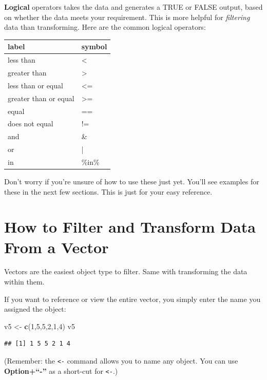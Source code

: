 \documentclass[
]{book}
\newenvironment{Shaded}{\begin{snugshade}}{\end{snugshade}}
\newcommand{\DecValTok}[1]{\textcolor[rgb]{0.00,0.00,0.81}{#1}}
\newcommand{\KeywordTok}[1]{\textcolor[rgb]{0.13,0.29,0.53}{\textbf{#1}}}
\newcommand{\NormalTok}[1]{#1}
\newcommand{\StringTok}[1]{\textcolor[rgb]{0.31,0.60,0.02}{#1}}
\begin{document}
\textbf{Logical} operators takes the data and generates a TRUE or FALSE output, based on whether the data meets your requirement. This is more helpful for \emph{filtering} data than transforming. Here are the common logical operators:

\begin{tabular}{ll}
\toprule
label & symbol\\
\midrule
less than & <\\
greater than & >\\
less than or equal & <=\\
greater than or equal & >=\\
equal & ==\\
\addlinespace
does not equal & !=\\
and & \&\\
or & |\\
in & \%in\%\\
\bottomrule
\end{tabular}

Don't worry if you're unsure of how to use these just yet. You'll see examples for these in the next few sections. This is just for your easy reference.

\hypertarget{how-to-filter-and-transform-data-from-a-vector}{%
\section{How to Filter and Transform Data From a Vector}\label{how-to-filter-and-transform-data-from-a-vector}}

Vectors are the easiest object type to filter. Same with transforming the data within them.

If you want to reference or view the entire vector, you simply enter the name you assigned the object:

\begin{Shaded}
\begin{Highlighting}[]
\NormalTok{v5 <-}\StringTok{ }\KeywordTok{c}\NormalTok{(}\DecValTok{1}\NormalTok{,}\DecValTok{5}\NormalTok{,}\DecValTok{5}\NormalTok{,}\DecValTok{2}\NormalTok{,}\DecValTok{1}\NormalTok{,}\DecValTok{4}\NormalTok{)}
\NormalTok{v5}
\end{Highlighting}
\end{Shaded}

\begin{verbatim}
## [1] 1 5 5 2 1 4
\end{verbatim}

(Remember: the \texttt{\textless{}-} command allows you to name any object. You can use \textbf{Option+``-''} as a short-cut for \texttt{\textless{}-}.)
\end{document}
